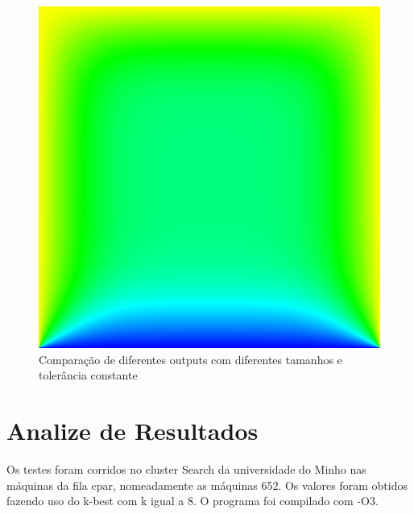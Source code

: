 \documentclass[a4paper]{report}
\begin{document}
\begin{figure}[h]
\begin{minipage}{.3\textwidth}
\end{minipage}
\begin{minipage}{.3\textwidth}
  \centering
  \includegraphics[width=.95\linewidth]{images/poisson_gs_1000.png}
\end{minipage}
    \caption{Comparação de diferentes outputs com diferentes tamanhos e
    tolerância constante}
\end{figure}

\chapter{Analize de Resultados}

Os testes foram corridos no cluster Search da universidade do Minho nas máquinas
da fila cpar, nomeadamente as máquinas 652. Os valores foram obtidos fazendo uso
do k-best com k igual a 8. O programa foi compilado com -O3.
\end{document}
